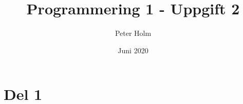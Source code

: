 \documentclass{article}
\title{Programmering 1 - Uppgift 2}
\author{Peter Holm}
\date{Juni 2020}
\begin{document}
\maketitle
\section{Del 1}



\newpage





\newpage



\newpage



\newpage



\newpage



\newpage


\end{document}
